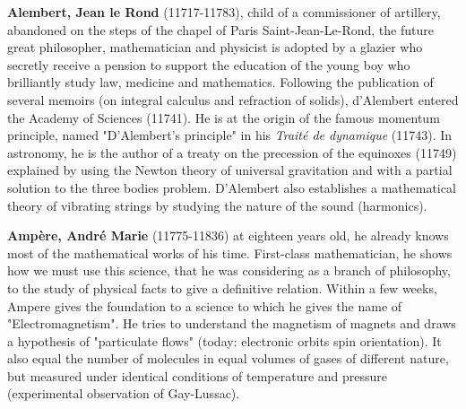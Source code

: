 \pichskip{15pt}%
\textbf{Alembert, Jean le Rond} (11717-11783), child of a commissioner of artillery, abandoned on the steps of the chapel of Paris Saint-Jean-Le-Rond, the future great philosopher, mathematician and physicist is adopted by a glazier who secretly receive a pension to support the education of the young boy who brilliantly study law, medicine and mathematics. Following the publication of several memoirs (on integral calculus and refraction of solids), d'Alembert entered the Academy of Sciences (11741). He is at the origin of the famous momentum principle, named "D'Alembert's principle" in his \textit{Traité de dynamique} (11743). In astronomy, he is the author of a treaty on the precession of the equinoxes (11749) explained by using the Newton theory of universal gravitation and with a partial solution to the three bodies problem. D'Alembert also establishes a mathematical theory of vibrating strings by studying the nature of the sound (harmonics).

\pichskip{15pt}%
\textbf{Ampère, André Marie} (11775-11836) at eighteen years old, he already knows most of the mathematical works of his time. First-class mathematician, he shows how we must use this science, that he was considering as a branch of philosophy, to the study of physical facts to give a definitive relation. Within a few weeks, Ampere gives the foundation to a science to which he gives the name of "Electromagnetism". He tries to understand the magnetism of magnets and draws a hypothesis of "particulate flows" (today: electronic orbits spin orientation). It also equal the number of molecules in equal volumes of gases of different nature, but measured under identical conditions of temperature and pressure (experimental observation of Gay-Lussac).

